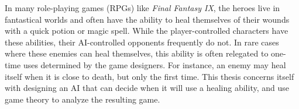 In many role-playing games (RPGs) like \textit{Final Fantasy IX}, the heroes live in fantastical worlds and often have the ability to heal themselves of their wounds with a quick potion or magic spell. While the player-controlled characters have these abilities, their AI-controlled opponents frequently do not. In rare cases where these enemies can heal themselves, this ability is often relegated to one-time uses determined by the game designers. For instance, an enemy may heal itself when it is close to death, but only the first time. This thesis concerns itself with designing an AI that can decide when it will use a healing ability, and use game theory to analyze the resulting game.